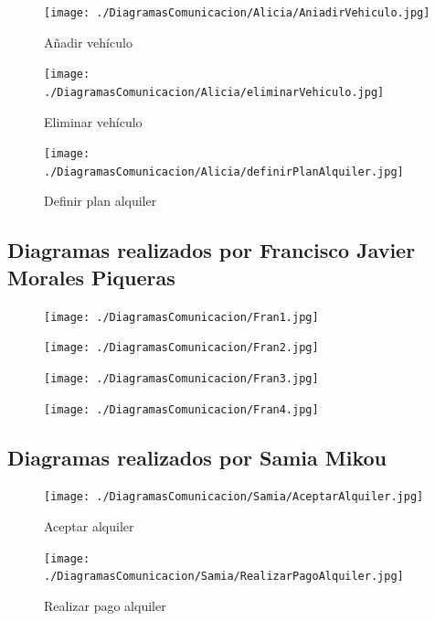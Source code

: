 \documentclass[11pt,spanish]{article} %
\begin{document}
\begin{figure}[H]
	\texttt{[image: ./DiagramasComunicacion/Alicia/AniadirVehiculo.jpg]}
	\caption{Añadir vehículo}
\end{figure}

\begin{figure}[H]
	\texttt{[image: ./DiagramasComunicacion/Alicia/eliminarVehiculo.jpg]}
	\caption{Eliminar vehículo}
\end{figure}

\begin{figure}[H]
	\texttt{[image: ./DiagramasComunicacion/Alicia/definirPlanAlquiler.jpg]}
	\caption{Definir plan alquiler}
\end{figure}
\newpage




\subsection{Diagramas realizados por Francisco Javier Morales Piqueras}
\begin{figure}[H]
	\texttt{[image: ./DiagramasComunicacion/Fran1.jpg]}
	\caption{}
\end{figure}

\begin{figure}[H]
	\texttt{[image: ./DiagramasComunicacion/Fran2.jpg]}
	\caption{}
\end{figure}

\begin{figure}[H]
	\texttt{[image: ./DiagramasComunicacion/Fran3.jpg]}
	\caption{}
\end{figure}

\begin{figure}[H]
	\texttt{[image: ./DiagramasComunicacion/Fran4.jpg]}
	\caption{}
\end{figure}
\newpage


\subsection{Diagramas realizados por Samia Mikou}
\begin{figure}[H]
	\texttt{[image: ./DiagramasComunicacion/Samia/AceptarAlquiler.jpg]}
	\caption{Aceptar alquiler}
\end{figure}

\begin{figure}[H]
	\texttt{[image: ./DiagramasComunicacion/Samia/RealizarPagoAlquiler.jpg]}
	\caption{Realizar pago alquiler}
\end{figure}
\end{document}
